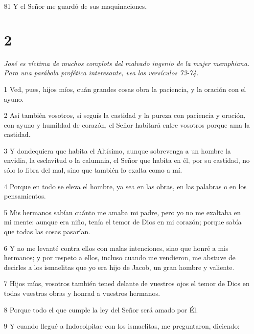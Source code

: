 \par 81 Y el Señor me guardó de sus maquinaciones.

\chapter{2}

\par \textit{José es víctima de muchos complots del malvado ingenio de la mujer memphiana. Para una parábola profética interesante, vea los versículos 73-74.}

\par 1 Ved, pues, hijos míos, cuán grandes cosas obra la paciencia, y la oración con el ayuno.

\par 2 Así también vosotros, si seguís la castidad y la pureza con paciencia y oración, con ayuno y humildad de corazón, el Señor habitará entre vosotros porque ama la castidad.

\par 3 Y dondequiera que habita el Altísimo, aunque sobrevenga a un hombre la envidia, la esclavitud o la calumnia, el Señor que habita en él, por su castidad, no sólo lo libra del mal, sino que también lo exalta como a mí.

\par 4 Porque en todo se eleva el hombre, ya sea en las obras, en las palabras o en los pensamientos.

\par 5 Mis hermanos sabían cuánto me amaba mi padre, pero yo no me exaltaba en mi mente: aunque era niño, tenía el temor de Dios en mi corazón; porque sabía que todas las cosas pasarían.

\par 6 Y no me levanté contra ellos con malas intenciones, sino que honré a mis hermanos; y por respeto a ellos, incluso cuando me vendieron, me abstuve de decirles a los ismaelitas que yo era hijo de Jacob, un gran hombre y valiente.

\par 7 Hijos míos, vosotros también tened delante de vuestros ojos el temor de Dios en todas vuestras obras y honrad a vuestros hermanos.

\par 8 Porque todo el que cumple la ley del Señor será amado por Él.

\par 9 Y cuando llegué a Indocolpitae con los ismaelitas, me preguntaron, diciendo:

